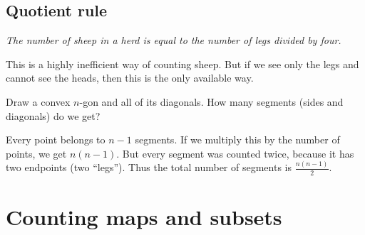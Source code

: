 \begin{page}
\setcounter{section}{1}
\setcounter{subsection}{4}
\setcounter{dfn}{3}
\label{portion:15}

\subsection{Quotient rule}
\begin{center}
\parbox{.9\textwidth}{\emph{The number of sheep in a herd is equal to the number of legs divided by four.}}
\end{center}
This is a highly inefficient way of counting sheep.
But if we see only the legs and cannot see the heads, then this is the only available way.


\end{page}

\begin{page}
\setcounter{section}{1}
\setcounter{subsection}{4}
\setcounter{dfn}{4}
\label{portion:17}

\begin{exl}
Draw a convex $n$-gon and all of its diagonals.
How many segments (sides and diagonals) do we get?

Every point belongs to $n-1$ segments.
If we multiply this by the number of points, we get $n(n-1)$.
But every segment was counted twice, because it has two endpoints (two ``legs'').
Thus the total number of segments is $\frac{n(n-1)}2$.
\end{exl}

\end{page}

\begin{page}
\setcounter{section}{2}
\setcounter{subsection}{1}
\setcounter{dfn}{0}
\label{portion:19}

\section{Counting maps and subsets}

\end{page}

